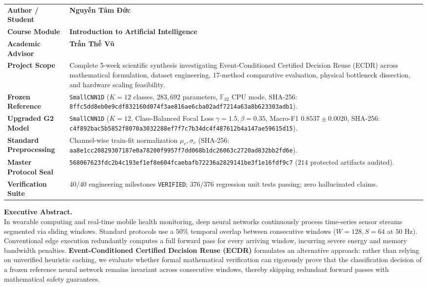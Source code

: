 \documentclass[journal,onecolumn,10pt]{IEEEtran}
\newcommand{\F}{\mathbb{F}}
\newcommand{\code}[1]{{\small\ttfamily\nolinkurl{#1}}}
\theoremstyle{remark}
\begin{document}
\begin{titlepage}
\begin{tabularx}{\linewidth}{@{}P{3.8cm}Y@{}}
\toprule
\textbf{Author / Student} & \textbf{Nguyễn Tâm Đức}\footnotemark[1] \\
\textbf{Course Module} & \textbf{Introduction to Artificial Intelligence} \\
\textbf{Academic Advisor} & \textbf{Trần Thế Vũ} \\
\textbf{Project Scope} & Complete 5-week scientific synthesis investigating Event-Conditioned Certified Decision Reuse (ECDR) across mathematical formulation, dataset engineering, 17-method comparative evaluation, physical bottleneck dissection, and hardware scaling feasibility.\\
\textbf{Frozen Reference} & \code{SmallCNN1D} ($K=12$ classes, $283,692$ parameters, $\F_{32}$ CPU mode, SHA-256: \code{8ffc5dd8eb0e9cdf832160d074f3ae816ae6cba02adf7214a63a8b623303adb1}).\\
\textbf{Upgraded G2 Model} & \code{SmallCNN1D} ($K=12$, Class-Balanced Focal Loss $\gamma=1.5, \beta=0.35$, Macro-F1 $0.8537 \pm 0.0020$, SHA-256: \code{c4f892bac5b5852f8070a3032288ef7f7c7b34dc4f487612b4a147ae59615d15}).\\
\textbf{Standard Preprocessing} & Channel-wise train-fit normalization $\mu_c, \sigma_c$ (SHA-256: \code{aa8e1cc20829307187e0a78200f9957f7dd068b1dc26063c2720ad832bb2fd6e}).\\
\textbf{Master Protocol Seal} & \code{568067623fdc2b4c193ef1ef8e604fcaebafb72236a2829141be3f1e16fdf9c7} ($214$ protected artifacts audited).\\
\textbf{Verification Suite} & $40/40$ engineering milestones \code{VERIFIED}; $376/376$ regression unit tests passing; zero hallucinated claims.\\
\bottomrule
\end{tabularx}

\vspace{0.45cm}
\noindent\colorbox{pale}{%
\parbox{\dimexpr\linewidth-2\fboxsep}{%
\textbf{\color{ink}Executive Abstract.}\\[3pt]
In wearable computing and real-time mobile health monitoring, deep neural networks continuously process time-series sensor streams segmented via sliding windows. Standard protocols use a $50\%$ temporal overlap between consecutive windows ($W=128, S=64$ at $50\text{ Hz}$). Conventional edge execution redundantly computes a full forward pass for every arriving window, incurring severe energy and memory bandwidth penalties. \textbf{Event-Conditioned Certified Decision Reuse (ECDR)} formulates an alternative approach: rather than relying on unverified heuristic caching, we evaluate whether formal mathematical verification can rigorously prove that the classification decision of a frozen reference neural network remains invariant across consecutive windows, thereby skipping redundant forward passes with mathematical safety guarantees.

}}
\end{titlepage}
\end{document}
